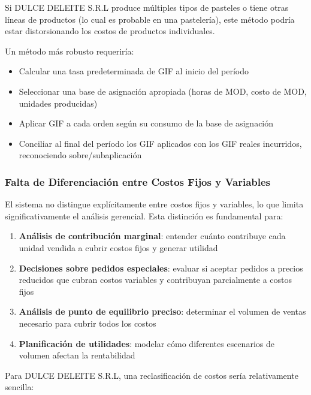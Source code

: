 \documentclass[
  stu,
  floatsintext,
  longtable,
  a4paper,
  nolmodern,
  notxfonts,
  notimes,
  12pt,
  colorlinks=true,linkcolor=blue,citecolor=blue,urlcolor=blue]{apa7}
\providecommand{\tightlist}{%
  \setlength{\itemsep}{0pt}\setlength{\parskip}{0pt}}
\begin{document}
Si DULCE DELEITE S.R.L produce múltiples tipos de pasteles o tiene otras
líneas de productos (lo cual es probable en una pastelería), este método
podría estar distorsionando los costos de productos individuales.

Un método más robusto requeriría:

\begin{itemize}
\tightlist
\item
  Calcular una tasa predeterminada de GIF al inicio del período
\item
  Seleccionar una base de asignación apropiada (horas de MOD, costo de
  MOD, unidades producidas)
\item
  Aplicar GIF a cada orden según su consumo de la base de asignación
\item
  Conciliar al final del período los GIF aplicados con los GIF reales
  incurridos, reconociendo sobre/subaplicación
\end{itemize}

\subsubsection{Falta de Diferenciación entre Costos Fijos y
Variables}\label{falta-de-diferenciaciuxf3n-entre-costos-fijos-y-variables}

El sistema no distingue explícitamente entre costos fijos y variables,
lo que limita significativamente el análisis gerencial. Esta distinción
es fundamental para:

\begin{enumerate}
\def\labelenumi{\arabic{enumi}.}
\item
  \textbf{Análisis de contribución marginal}: entender cuánto contribuye
  cada unidad vendida a cubrir costos fijos y generar utilidad
\item
  \textbf{Decisiones sobre pedidos especiales}: evaluar si aceptar
  pedidos a precios reducidos que cubran costos variables y contribuyan
  parcialmente a costos fijos
\item
  \textbf{Análisis de punto de equilibrio preciso}: determinar el
  volumen de ventas necesario para cubrir todos los costos
\item
  \textbf{Planificación de utilidades}: modelar cómo diferentes
  escenarios de volumen afectan la rentabilidad
\end{enumerate}

Para DULCE DELEITE S.R.L, una reclasificación de costos sería
relativamente sencilla:
\end{document}
